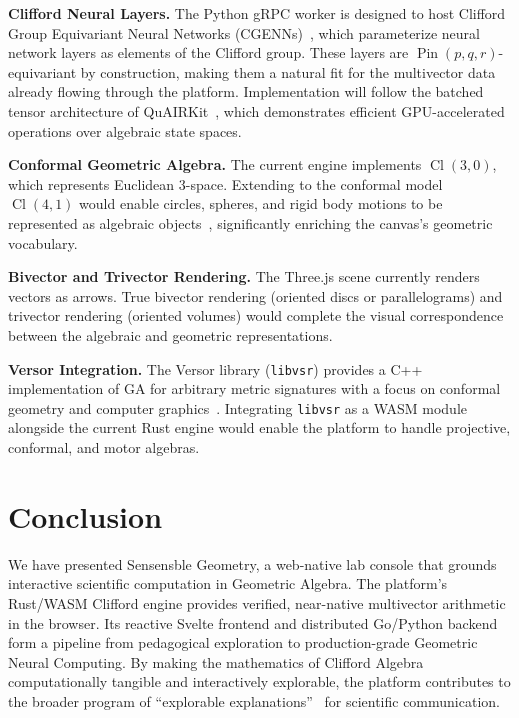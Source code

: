 \documentclass[conference]{IEEEtran}
\begin{document}
\textbf{Clifford Neural Layers.} The Python gRPC worker is designed to host Clifford Group Equivariant Neural Networks (CGENNs)~\cite{b_ruhe}, which parameterize neural network layers as elements of the Clifford group. These layers are $\operatorname{Pin}(p,q,r)$-equivariant by construction, making them a natural fit for the multivector data already flowing through the platform. Implementation will follow the batched tensor architecture of QuAIRKit~\cite{b_quairkit}, which demonstrates efficient GPU-accelerated operations over algebraic state spaces.

\textbf{Conformal Geometric Algebra.} The current engine implements $\operatorname{Cl}(3,0)$, which represents Euclidean 3-space. Extending to the conformal model $\operatorname{Cl}(4,1)$ would enable circles, spheres, and rigid body motions to be represented as algebraic objects~\cite{b_dorst}, significantly enriching the canvas's geometric vocabulary.

\textbf{Bivector and Trivector Rendering.} The Three.js scene currently renders vectors as arrows. True bivector rendering (oriented discs or parallelograms) and trivector rendering (oriented volumes) would complete the visual correspondence between the algebraic and geometric representations.

\textbf{Versor Integration.} The Versor library (\texttt{libvsr}) provides a C++ implementation of GA for arbitrary metric signatures with a focus on conformal geometry and computer graphics~\cite{b_versor}. Integrating \texttt{libvsr} as a WASM module alongside the current Rust engine would enable the platform to handle projective, conformal, and motor algebras.

\section{Conclusion}

We have presented Sensensble Geometry, a web-native lab console that grounds interactive scientific computation in Geometric Algebra. The platform's Rust/WASM Clifford engine provides verified, near-native multivector arithmetic in the browser. Its reactive Svelte frontend and distributed Go/Python backend form a pipeline from pedagogical exploration to production-grade Geometric Neural Computing. By making the mathematics of Clifford Algebra computationally tangible and interactively explorable, the platform contributes to the broader program of ``explorable explanations''~\cite{b_victor} for scientific communication.
\end{document}
